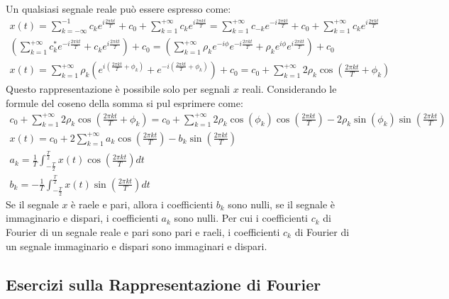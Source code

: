 \documentclass{article}
\numberwithin{equation}{subsection}
\begin{document}
Un qualsiasi segnale reale può essere espresso come:
\begin{gather*}
    x(t)=\displaystyle\sum_{k=-\infty}^{-1}c_ke^{i\frac{2\pi kt}{T}}+c_0+\sum_{k=1}^{+\infty}c_ke^{i\frac{2\pi kt}{T}}=\sum_{k=1}^{+\infty}c_{-k}e^{-i\frac{2\pi kt}{T}}+c_0+\sum_{k=1}^{+\infty}c_ke^{i\frac{2\pi kt}{T}}\\
    \displaystyle\left(\sum_{k=1}^{+\infty}c_k^*e^{-i\frac{2\pi kt}{T}}+c_ke^{i\frac{2\pi kt}{T}}\right)+c_0=\left(\sum_{k=1}^{+\infty}\rho_k e^{-i\phi}e^{-i\frac{2\pi kt}{T}}+\rho_ke^{i\phi}e^{i\frac{2\pi kt}{T}}\right)+c_0\\
    x(t)=\displaystyle\sum_{k=1}^{+\infty}\rho_k \left(e^{i\left(\frac{2\pi kt}{T}+\phi_k\right)}+e^{-i\left(\frac{2\pi kt}{T}+\phi_k\right)}\right)+c_0=\displaystyle c_0+\sum_{k=1}^{+\infty}2\rho_k\cos\left(\frac{2\pi kt}{T}+\phi_k\right)
\end{gather*}
Questo rappresentazione è possibile solo per segnali $x$ reali. 
Considerando le formule del coseno della somma si pul esprimere come:
\begin{gather*}
    \displaystyle c_0+\sum_{k=1}^{+\infty}2\rho_k\cos\left(\frac{2\pi kt}{T}+\phi_k\right)=
    c_0+\sum_{k=1}^{+\infty}2\rho_k\cos(\phi_k)\cos\left(\frac{2\pi kt}{T}\right)-2\rho_k\sin(\phi_k)\sin\left(\frac{2\pi kt}{T}\right)\\
    x(t)=\displaystyle c_0+2\sum_{k=1}^{+\infty}a_k\cos\left(\frac{2\pi kt}{T}\right)-b_k\sin\left(\frac{2\pi kt}{T}\right)\\
    a_k=\displaystyle\frac{1}{T}\int_{-\frac{T}{2}}^{\frac{T}{2}}x(t)\cos\left(\frac{2\pi kt}{T}\right)dt\\
    b_k=\displaystyle-\frac{1}{T}\int_{-\frac{T}{2}}^{\frac{T}{2}}x(t)\sin\left(\frac{2\pi kt}{T}\right)dt
\end{gather*}
Se il segnale $x$ è raele e pari, allora i coefficienti $b_k$ sono nulli, se il segnale è immaginario e dispari, i coefficienti $a_k$ sono nulli. 
Per cui i coefficienti $c_k$ di Fourier di un segnale reale e pari sono pari e raeli, i coefficienti $c_k$ di Fourier di un segnale immaginario e 
dispari sono immaginari e dispari. 

\subsection{Esercizi sulla Rappresentazione di Fourier}
\end{document}
